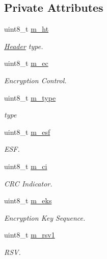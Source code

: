\subsection*{Private Attributes}
\begin{DoxyCompactItemize}
\item 
uint8\+\_\+t \hyperlink{classns3_1_1GenericMacHeader_a35c4cce15809ec8472e236d4595693b0}{m\+\_\+ht}
\begin{DoxyCompactList}\small\item\em \hyperlink{classns3_1_1Header}{Header} type. \end{DoxyCompactList}\item 
uint8\+\_\+t \hyperlink{classns3_1_1GenericMacHeader_a926fba749a72e5069afb7dfe0d9b565a}{m\+\_\+ec}
\begin{DoxyCompactList}\small\item\em Encryption Control. \end{DoxyCompactList}\item 
uint8\+\_\+t \hyperlink{classns3_1_1GenericMacHeader_ad117be226baa0fd1757cdba611016844}{m\+\_\+type}
\begin{DoxyCompactList}\small\item\em type \end{DoxyCompactList}\item 
uint8\+\_\+t \hyperlink{classns3_1_1GenericMacHeader_a8326410f7581488e9ad38660fce99eeb}{m\+\_\+esf}
\begin{DoxyCompactList}\small\item\em E\+SF. \end{DoxyCompactList}\item 
uint8\+\_\+t \hyperlink{classns3_1_1GenericMacHeader_ac963f44cb95647ccba2d650005f8ed60}{m\+\_\+ci}
\begin{DoxyCompactList}\small\item\em C\+RC Indicator. \end{DoxyCompactList}\item 
uint8\+\_\+t \hyperlink{classns3_1_1GenericMacHeader_afd010ab0a6858a4b354fbe375f9a28a8}{m\+\_\+eks}
\begin{DoxyCompactList}\small\item\em Encryption Key Sequence. \end{DoxyCompactList}\item 
uint8\+\_\+t \hyperlink{classns3_1_1GenericMacHeader_a4a38605264c8e8c6f3e7f28f772f5308}{m\+\_\+rsv1}
\begin{DoxyCompactList}\small\item\em R\+SV. \end{DoxyCompactList}\item 

\end{DoxyCompactItemize}
